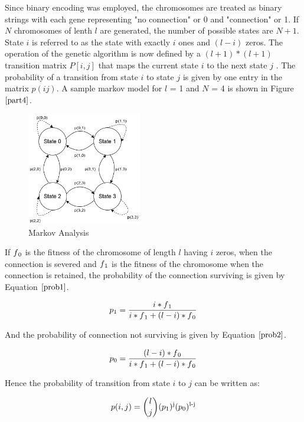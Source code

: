 \documentclass[conference]{IEEEtran}
\begin{document}
Since binary encoding was employed, the chromosomes are treated as binary strings with each gene representing "no connection" or 0 and "connection" or 1. If $N$ chromosomes of lenth $l$ are generated, the number of possible states are $N+1$. State $i$ is referred to as the state with exactly $i$ ones and $(l - i)$ zeros. The operation of the genetic algorithm is now defined by a $(l + 1)*(l + 1)$ transition matrix $P[i, j]$ that maps the current state $i$ to the next state $j$ . The probability of a transition from state $i$ to state $j$ is given by one
entry in the matrix $p(ij)$. A sample markov model for $l$ = 1 and $N$ = 4 is shown in Figure $\ref{part4}$.

\begin{figure}[!b]
\centerline{\includegraphics[width=50mm]{part4.png}}
\caption{Markov Analysis}
\label{part4}
\end{figure}

If $f\textsubscript{0}$ is the fitness of the chromosome of length $l$ having $i$ zeros, when the connection is severed and $f\textsubscript{1}$ is the fitness of the chromosome when the connection is retained, the probability of the connection surviving is given by Equation $\ref{prob1}$.

\begin{equation}
p\textsubscript{1} = \frac{i*f\textsubscript{1}}{i*f\textsubscript{1} + (l-i)*f\textsubscript{0}}
\label{prob1}
\end{equation}

And the probability of connection not surviving is given by Equation $\ref{prob2}$.

\begin{equation}
p\textsubscript{0} = \frac{(l-i)*f\textsubscript{0}}{i*f\textsubscript{1} + (l-i)*f\textsubscript{0}}
\label{prob2}
\end{equation}

Hence the probability of transition from state $i$ to $j$ can be written as:

\begin{equation}
p(i,j) = {l \choose j}(p\textsubscript{1})\textsuperscript{j}(p\textsubscript{0})\textsuperscript{l-j}\\
\label{prob3}
\end{equation}
\end{document}
